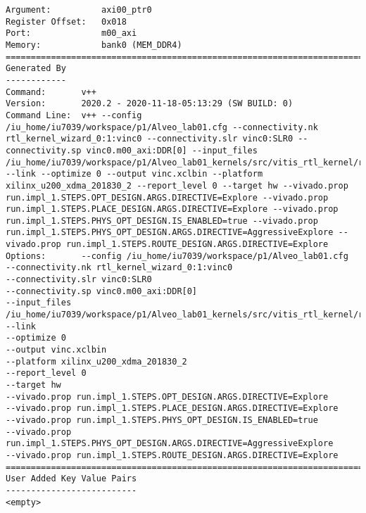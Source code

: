 \begin{lstlisting}[label=lst:lev_rec,caption=Содержимое xclbin.info-файла]
Argument:          axi00_ptr0
Register Offset:   0x018
Port:              m00_axi
Memory:            bank0 (MEM_DDR4)
==============================================================================
Generated By
------------
Command:       v++
Version:       2020.2 - 2020-11-18-05:13:29 (SW BUILD: 0)
Command Line:  v++ --config /iu_home/iu7039/workspace/p1/Alveo_lab01.cfg --connectivity.nk rtl_kernel_wizard_0:1:vinc0 --connectivity.slr vinc0:SLR0 --connectivity.sp vinc0.m00_axi:DDR[0] --input_files /iu_home/iu7039/workspace/p1/Alveo_lab01_kernels/src/vitis_rtl_kernel/rtl_kernel_wizard_0/rtl_kernel_wizard_0.xo --link --optimize 0 --output vinc.xclbin --platform xilinx_u200_xdma_201830_2 --report_level 0 --target hw --vivado.prop run.impl_1.STEPS.OPT_DESIGN.ARGS.DIRECTIVE=Explore --vivado.prop run.impl_1.STEPS.PLACE_DESIGN.ARGS.DIRECTIVE=Explore --vivado.prop run.impl_1.STEPS.PHYS_OPT_DESIGN.IS_ENABLED=true --vivado.prop run.impl_1.STEPS.PHYS_OPT_DESIGN.ARGS.DIRECTIVE=AggressiveExplore --vivado.prop run.impl_1.STEPS.ROUTE_DESIGN.ARGS.DIRECTIVE=Explore 
Options:       --config /iu_home/iu7039/workspace/p1/Alveo_lab01.cfg
--connectivity.nk rtl_kernel_wizard_0:1:vinc0
--connectivity.slr vinc0:SLR0
--connectivity.sp vinc0.m00_axi:DDR[0]
--input_files /iu_home/iu7039/workspace/p1/Alveo_lab01_kernels/src/vitis_rtl_kernel/rtl_kernel_wizard_0/rtl_kernel_wizard_0.xo
--link
--optimize 0
--output vinc.xclbin
--platform xilinx_u200_xdma_201830_2
--report_level 0
--target hw
--vivado.prop run.impl_1.STEPS.OPT_DESIGN.ARGS.DIRECTIVE=Explore
--vivado.prop run.impl_1.STEPS.PLACE_DESIGN.ARGS.DIRECTIVE=Explore
--vivado.prop run.impl_1.STEPS.PHYS_OPT_DESIGN.IS_ENABLED=true
--vivado.prop run.impl_1.STEPS.PHYS_OPT_DESIGN.ARGS.DIRECTIVE=AggressiveExplore
--vivado.prop run.impl_1.STEPS.ROUTE_DESIGN.ARGS.DIRECTIVE=Explore 
==============================================================================
User Added Key Value Pairs
--------------------------
<empty>
\end{lstlisting}